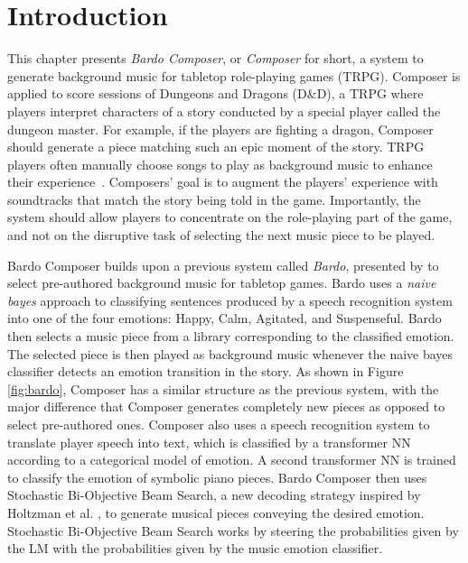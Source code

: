 \section{Introduction}

This chapter presents \textit{Bardo Composer}, or \textit{Composer} for short, a system to generate background music for tabletop role-playing games (TRPG). Composer is applied to score sessions of Dungeons and Dragons (D\&D), a TRPG where players interpret characters of a story conducted by a special player called the dungeon master. For example, if the players are fighting a dragon, Composer should generate a piece matching such an epic moment of the story. TRPG players often manually choose songs to play as background music to enhance their experience~\cite{bergstrom2014case}. Composers' goal is to augment the players' experience with soundtracks that match the story being told in the game. Importantly, the system should allow players to concentrate on the role-playing part of the game, and not on the disruptive task of selecting the next music piece to be played.

Bardo Composer builds upon a previous system called \textit{Bardo}, presented by \citet{padovani2017} to select pre-authored background music for tabletop games. Bardo uses a \textit{naive bayes} approach to classifying sentences produced by a speech recognition system into one of the four emotions: Happy, Calm, Agitated, and Suspenseful. Bardo then selects a music piece from a library corresponding to the classified emotion. The selected piece is then played as background music whenever the naive bayes classifier detects an emotion transition in the story. As shown in Figure \ref{fig:bardo}, Composer has a similar structure as the previous system, with the major difference that Composer generates completely new pieces as opposed to select pre-authored ones. Composer also uses a speech recognition system to translate player speech into text, which is classified by a transformer NN according to a categorical model of emotion. A second transformer NN is trained to classify the emotion of symbolic piano pieces. Bardo Composer then uses Stochastic Bi-Objective Beam Search, a new decoding strategy inspired by Holtzman et al. \cite{holtzman2018learning}, to generate musical pieces conveying the desired emotion. Stochastic Bi-Objective Beam Search works by steering the probabilities given by the LM with the probabilities given by the music emotion classifier.

